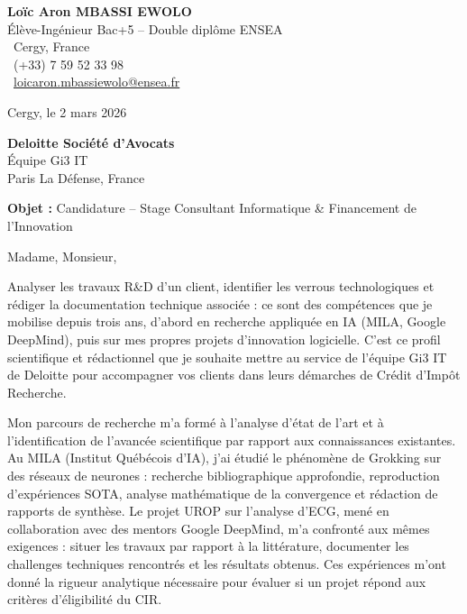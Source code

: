 \documentclass[a4paper,11pt]{article}
\begin{document}
\noindent
\begin{minipage}[t]{0.5\textwidth}
    \textbf{Loïc Aron MBASSI EWOLO}\\
    Élève-Ingénieur Bac+5 -- Double diplôme ENSEA\\[3pt]
    \faMapMarker\ Cergy, France\\
    \faPhone\ (+33) 7 59 52 33 98\\
    \faEnvelope\ \href{mailto:loicaron.mbassiewolo@ensea.fr}{loicaron.mbassiewolo@ensea.fr}
\end{minipage}
\hfill
\begin{minipage}[t]{0.4\textwidth}
    \raggedleft
    Cergy, le 2 mars 2026
\end{minipage}

\vspace{1.2cm}

\hfill
\begin{minipage}[t]{0.5\textwidth}
    \raggedleft
    \textbf{Deloitte Société d'Avocats}\\
    Équipe Gi3 IT\\
    Paris La Défense, France
\end{minipage}

\vspace{1cm}

\noindent\textbf{Objet :} Candidature -- Stage Consultant Informatique \& Financement de l'Innovation

\vspace{0.8cm}

Madame, Monsieur,

Analyser les travaux R\&D d'un client, identifier les verrous technologiques et rédiger la documentation technique associée : ce sont des compétences que je mobilise depuis trois ans, d'abord en recherche appliquée en IA (MILA, Google DeepMind), puis sur mes propres projets d'innovation logicielle. C'est ce profil scientifique et rédactionnel que je souhaite mettre au service de l'équipe Gi3 IT de Deloitte pour accompagner vos clients dans leurs démarches de Crédit d'Impôt Recherche.

Mon parcours de recherche m'a formé à l'analyse d'état de l'art et à l'identification de l'avancée scientifique par rapport aux connaissances existantes. Au MILA (Institut Québécois d'IA), j'ai étudié le phénomène de Grokking sur des réseaux de neurones : recherche bibliographique approfondie, reproduction d'expériences SOTA, analyse mathématique de la convergence et rédaction de rapports de synthèse. Le projet UROP sur l'analyse d'ECG, mené en collaboration avec des mentors Google DeepMind, m'a confronté aux mêmes exigences : situer les travaux par rapport à la littérature, documenter les challenges techniques rencontrés et les résultats obtenus. Ces expériences m'ont donné la rigueur analytique nécessaire pour évaluer si un projet répond aux critères d'éligibilité du CIR.
\end{document}
